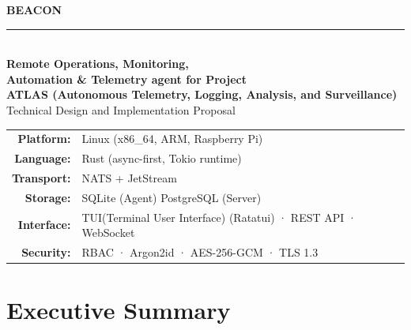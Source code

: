 \documentclass[12pt,a4paper]{article}
\begin{document}
\begin{titlepage}
    \pagecolor{beaconblue}
    \color{white}
    \centering
    \vspace*{3cm}

    {\fontsize{56}{60}\selectfont\bfseries BEACON}\\[0.5cm]
    {\color{beaconaccent}\rule{10cm}{2pt}}\\[0.8cm]
    {\Large\bfseries Remote Operations, Monitoring,}\\[0.3cm]
    {\Large\bfseries Automation \& Telemetry agent for Project}\\
    {\Large\bfseries ATLAS (Autonomous Telemetry, Logging, Analysis, and Surveillance)}\\[2cm]

    {\large Technical Design and Implementation Proposal}\\[0.4cm]

    \begin{tabular}{rl}
        \textbf{Platform:}    & Linux (x86\_64, ARM, Raspberry Pi) \\[0.3em]
        \textbf{Language:}    & Rust (async-first, Tokio runtime) \\[0.3em]
        \textbf{Transport:}   & NATS + JetStream \\[0.3em]
        \textbf{Storage:}     & SQLite (Agent) \quad PostgreSQL (Server) \\[0.3em]
        \textbf{Interface:}   & TUI(Terminal User Interface) (Ratatui) · REST API · WebSocket \\[0.3em]
        \textbf{Security:}    & RBAC · Argon2id · AES-256-GCM · TLS 1.3 \\
    \end{tabular}

    \vfill
\end{titlepage}
\nopagecolor

\newpage
\tableofcontents
\newpage

\section{Executive Summary}
\end{document}
